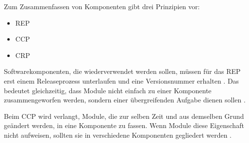 
Zum Zusammenfassen von Komponenten gibt  drei Prinzipien vor:
\begin{itemize}
\item \ac{REP}
\item \ac{CCP}
\item \ac{CRP}
\end{itemize}

Softwarekomponenten, die wiederverwendet werden sollen, müssen für das \ac{REP} erst einem Releaseprozess unterlaufen und eine Versionsnummer erhalten \citep[vgl.][104]{martin2018}. Das bedeutet gleichzeitig, dass Module nicht einfach zu einer Komponente zusammengeworfen werden, sondern einer übergreifenden Aufgabe dienen sollen \citep[vgl.][105]{martin2018}.



Beim \ac{CCP} wird verlangt, Module, die zur selben Zeit und aus demselben Grund geändert werden, in eine Komponente zu fassen. Wenn Module diese Eigenschaft nicht aufweisen, sollten sie in verschiedene Komponenten gegliedert werden \citep[vgl.][105]{martin2018}.
 

